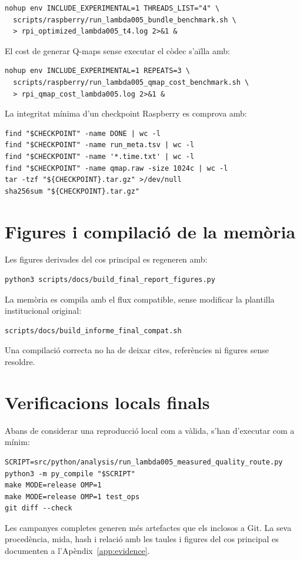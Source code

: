 \begin{verbatim}
nohup env INCLUDE_EXPERIMENTAL=1 THREADS_LIST="4" \
  scripts/raspberry/run_lambda005_bundle_benchmark.sh \
  > rpi_optimized_lambda005_t4.log 2>&1 &
\end{verbatim}

El cost de generar Q-maps sense executar el còdec s'aïlla amb:

\begin{verbatim}
nohup env INCLUDE_EXPERIMENTAL=1 REPEATS=3 \
  scripts/raspberry/run_lambda005_qmap_cost_benchmark.sh \
  > rpi_qmap_cost_lambda005.log 2>&1 &
\end{verbatim}

La integritat mínima d'un checkpoint Raspberry es comprova amb:

\begin{verbatim}
find "$CHECKPOINT" -name DONE | wc -l
find "$CHECKPOINT" -name run_meta.tsv | wc -l
find "$CHECKPOINT" -name '*.time.txt' | wc -l
find "$CHECKPOINT" -name qmap.raw -size 1024c | wc -l
tar -tzf "${CHECKPOINT}.tar.gz" >/dev/null
sha256sum "${CHECKPOINT}.tar.gz"
\end{verbatim}

\section{Figures i compilació de la memòria}

Les figures derivades del cos principal es regeneren amb:

\begin{verbatim}
python3 scripts/docs/build_final_report_figures.py
\end{verbatim}

La memòria es compila amb el flux compatible, sense modificar la plantilla
institucional original:

\begin{verbatim}
scripts/docs/build_informe_final_compat.sh
\end{verbatim}

Una compilació correcta no ha de deixar cites, referències ni figures sense
resoldre.

\section{Verificacions locals finals}

Abans de considerar una reproducció local com a vàlida, s'han d'executar com a
mínim:

\begin{verbatim}
SCRIPT=src/python/analysis/run_lambda005_measured_quality_route.py
python3 -m py_compile "$SCRIPT"
make MODE=release OMP=1
make MODE=release OMP=1 test_ops
git diff --check
\end{verbatim}

Les campanyes completes generen més artefactes que els inclosos a Git. La seva
procedència, mida, hash i relació amb les taules i figures del cos principal es
documenten a l'Apèndix~\ref{app:evidence}.
